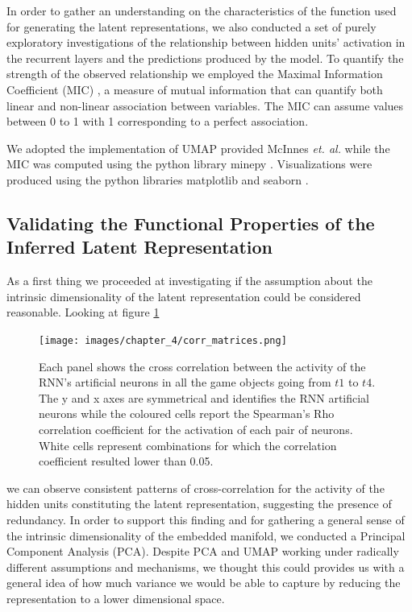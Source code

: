 In order to gather an understanding on the characteristics of the function used for generating the latent representations, we also conducted a set of purely exploratory investigations of the relationship between hidden units' activation in the recurrent layers and the predictions produced by the model. To quantify the strength of the observed relationship we employed the Maximal Information Coefficient (MIC) \cite{reshef2011detecting}, a measure of mutual information that can quantify both linear and non-linear association between variables. The MIC can assume values between 0 to 1 with 1 corresponding to a perfect association. 

We adopted the implementation of UMAP provided McInnes \textit{et. al.} \cite{mcinnes2018umap-software} while the MIC was computed using the python library minepy \cite{albanese2013minerva}. Visualizations were produced using the python libraries matplotlib \cite{hunter2007matplotlib} and seaborn \cite{waskom2021seaborn}.

\subsection{Validating the Functional Properties of the Inferred Latent Representation}
\label{functional_properties}
As a first thing we proceeded at investigating if the assumption about the intrinsic dimensionality of the latent representation could be considered reasonable. Looking at figure \ref{cross_corr_act}

\begin{figure}[h]
\centering
\texttt{[image: images/chapter\_4/corr\_matrices.png]}
\caption[\textbf{Cross-correlation analysis of the hidden units activation of the RNN architecture}]{Each panel shows the cross correlation between the activity of the RNN's artificial neurons in all the game objects going from $t1$ to $t4$. The y and x axes are symmetrical and identifies the RNN artificial neurons while the coloured cells report the Spearman's Rho correlation coefficient for the activation of each pair of neurons. White cells represent combinations for which the correlation coefficient resulted lower than 0.05.}
\label{cross_corr_act} 
\end{figure}

we can observe consistent patterns of cross-correlation for the activity of the hidden units constituting the latent representation, suggesting the presence of redundancy. In order to support this finding and for gathering a general sense of the intrinsic dimensionality of the embedded manifold, we  conducted a Principal Component Analysis (PCA). Despite PCA and UMAP working under radically different assumptions and mechanisms, we thought this could provides us with a general idea of how much variance we would be able to capture by reducing the representation to a lower dimensional space. 

